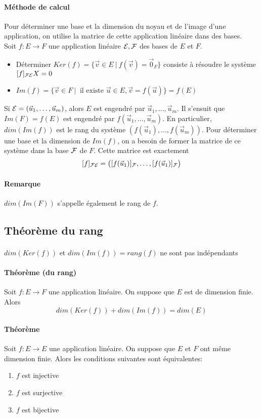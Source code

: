 \paragraph{Méthode de calcul} Pour déterminer une base et la dimension du noyau et de l'image d'une application, on utilise la matrice de cette application linéaire dans des bases. \\
Soit $f: E \rightarrow F$ une application linéaire $\mathcal{E}, \mathcal{F}$ des bases de $E$ et $F$.
\begin{itemize}
  \item Déterminer $Ker(f) = \{\vec{v} \in E ~ \vert ~ f(\vec{v}) = \vec{0}_F \}$ consiste à résoudre le système $[f]_{\mathcal{F} \mathcal{E}} X = 0$
  \item $Im(f) = \{ \vec{v} \in F ~ \vert ~ \text{ il existe } \vec{u} \in E, \vec{v} = f(\vec{u}) \} = f(E)$
\end{itemize}
Si $\mathcal{E} = (\vec{u}_1, \ldots, \vec{u}_m)$, alors $E$ est engendré par $\vec{u}_1, \ldots, \vec{u}_m$. Il s'ensuit que $Im(F) = f(E)$ est engendré par $f(\vec{u}_1, \ldots, \vec{u}_m)$. En particulier, $dim(Im(f))$ est le rang du système $(f(\vec{u}_1), \ldots, f(\vec{u}_m))$. Pour déterminer une base et la dimension de $Im(f)$, on a besoin de former la matrice de ce système dans la base $\mathcal{F}$ de $F$. Cette matrice est exactement 
$$[f]_{\mathcal{F} \mathcal{E}} = \big([f(\vec{u}_1)]_{\mathcal{F}}, \ldots, [f(\vec{u}_1)]_{\mathcal{F}}\big)$$

\paragraph{Remarque} $dim(Im(F))$ s'appelle également le rang de $f$.

%
\subsection{Théorème du rang}
%
\paragraph{} $dim(Ker(f))$ et $dim(Im(f)) = rang(f)$ ne sont pas indépendants
\paragraph{Théorème (du rang)} Soit $f: E \rightarrow F$ une application linéaire. On suppose que $E$ est de dimension finie. Alors
$$dim(Ker(f)) + dim(Im(f)) = dim(E)$$

\paragraph{Théorème} Soit $f: E \rightarrow E$ une application linéaire. On suppose que $E$ et $F$ ont même dimension finie. Alors les conditions suivantes sont équivalentes:
\begin{enumerate}
  \item $f$ est injective 
  \item $f$ est surjective
  \item $f$ est bijective
\end{enumerate}

